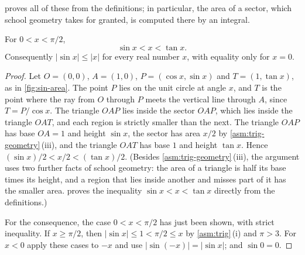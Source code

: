  proves all of these from the definitions; in particular, the area of a sector, which school geometry takes for granted, is computed there by an integral.

\begin{lemma}
\label{lem:sin-bounds}
For $0<x<\pi/2$,
\[
\sin x<x<\tan x .
\]
Consequently $|\sin x|\le|x|$ for every real number $x$, with equality only for $x=0$.
\end{lemma}

\begin{proof}
Let $O=(0,0)$, $A=(1,0)$, $P=(\cos x,\sin x)$ and $T=(1,\tan x)$, as in \cref{fig:sin-area}. The point $P$ lies on the unit circle at angle $x$, and $T$ is the point where the ray from $O$ through $P$ meets the vertical line through $A$, since $T=P/\cos x$. The triangle $OAP$ lies inside the sector $OAP$, which lies inside the triangle $OAT$, and each region is strictly smaller than the next. The triangle $OAP$ has base $OA=1$ and height $\sin x$, the sector has area $x/2$ by \cref{asm:trig-geometry}\,(iii), and the triangle $OAT$ has base $1$ and height $\tan x$. Hence $(\sin x)/2<x/2<(\tan x)/2$. (Besides \cref{asm:trig-geometry}\,(iii), the argument uses two further facts of school geometry: the area of a triangle is half its base times its height, and a region that lies inside another and misses part of it has the smaller area.  proves the inequality $\sin x<x<\tan x$ directly from the definitions.)

For the consequence, the case $0<x<\pi/2$ has just been shown, with strict inequality. If $x\ge\pi/2$, then $|\sin x|\le1<\pi/2\le x$ by \cref{asm:trig}\,(i) and $\pi>3$. For $x<0$ apply these cases to $-x$ and use $|\sin(-x)|=|\sin x|$; and $\sin0=0$.
\end{proof}

\begin{figure}
\end{figure}

